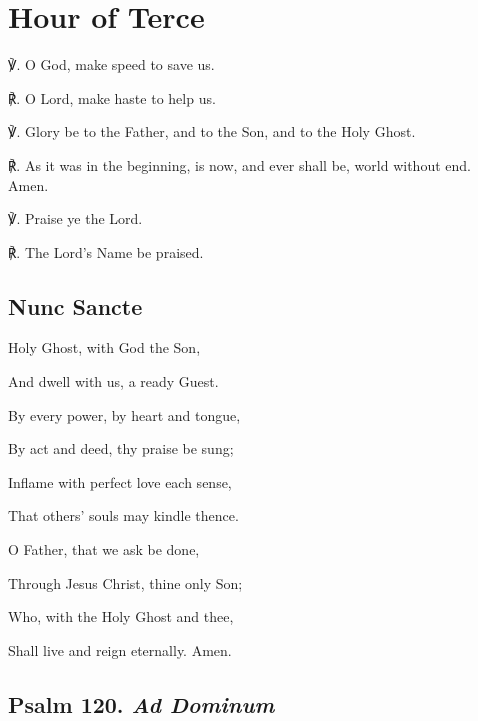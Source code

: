 \fancyhead[RE,LO]{}
\section{Hour of Terce}

\begin{multicols}{2}

℣. O God, {} make speed to save us.

℟. O Lord, make haste to help us.

℣. Glory be to the Father, and to the Son, and to the Holy Ghost.

℟. As it was in the beginning, is now, and ever shall be, world without end. Amen.

℣. Praise ye the Lord.

℟. The Lord's Name be praised.

\subsection{Nunc Sancte}
\begin{hangparas}{1.25em}{1}
 Holy Ghost, with God the Son,\par
{}\par\noindent
{}\par\noindent
And dwell with us, a ready Guest.\\
\par\noindent
By every power, by heart and tongue,\par\noindent
By act and deed, thy praise be sung;\par\noindent
Inflame with perfect love each sense,\par\noindent
That others' souls may kindle thence.\\
\par\noindent
O Father, that we ask be done,\par\noindent
Through Jesus Christ, thine only Son;\par\noindent
Who, with the Holy Ghost and thee,\par\noindent
Shall live and reign eternally. Amen.\\
\end{hangparas}

\subsection{Psalm 120. \textit{Ad Dominum}}


\end{multicols}
